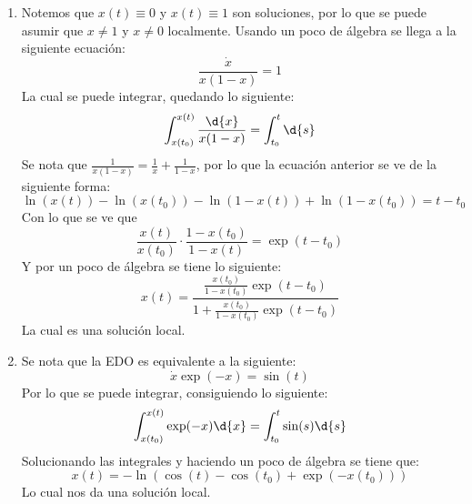 \documentclass{homework}
\begin{document}
\begin{sol}
    \begin{enumerate}
        \item Notemos que \(x(t)\equiv0\) y \(x(t)\equiv1\) son soluciones, por lo que se puede asumir que \(x\neq1\) y \(x\neq0\) localmente. Usando un poco de álgebra se llega a la siguiente ecuación:
        \begin{equation*}
            \frac{\dot{x}}{x(1-x)}=1
        \end{equation*}
        La cual se puede integrar, quedando lo siguiente:
        \begin{equation*}
            \int_{x(t_0)}^{x(t)}\frac{\d{x}}{x(1-x)}=\int_{t_0}^t\d{s}
        \end{equation*}
        Se nota que \(\frac1{x(1-x)}=\frac1x+\frac1{1-x}\), por lo que la ecuación anterior se ve de la siguiente forma:
        \begin{equation*}
            \ln(x(t))-\ln(x(t_0))-\ln(1-x(t))+\ln(1-x(t_0))=t-t_0
        \end{equation*}
        Con lo que se ve que
        \begin{equation*}
            \frac{x(t)}{x(t_0)}\cdot\frac{1-x(t_0)}{1-x(t)}=\exp(t-t_0)
        \end{equation*}
        Y por un poco de álgebra se tiene lo siguiente:
        \begin{equation*}
            x(t)=\dfrac{\frac{x(t_0)}{1-x(t_0)}\exp(t-t_0)}{1+\frac{x(t_0)}{1-x(t_0)}\exp(t-t_0)}
        \end{equation*}
        La cual es una solución local.
        \item Se nota que la EDO es equivalente a la siguiente:
        \begin{equation*}
            \dot{x}\exp(-x)=\sin(t)
        \end{equation*}
        Por lo que se puede integrar, consiguiendo lo siguiente:
        \begin{equation*}
            \int_{x(t_0)}^{x(t)}\exp(-x)\d{x}=\int_{t_0}^t\sin(s)\d{s}
        \end{equation*}
        Solucionando las integrales y haciendo un poco de álgebra se tiene que:
        \begin{equation*}
            x(t)=-\ln(\cos(t)-\cos(t_0)+\exp(-x(t_0)))
        \end{equation*}
        Lo cual nos da una solución local.
    \end{enumerate}
\end{sol}
\end{document}
